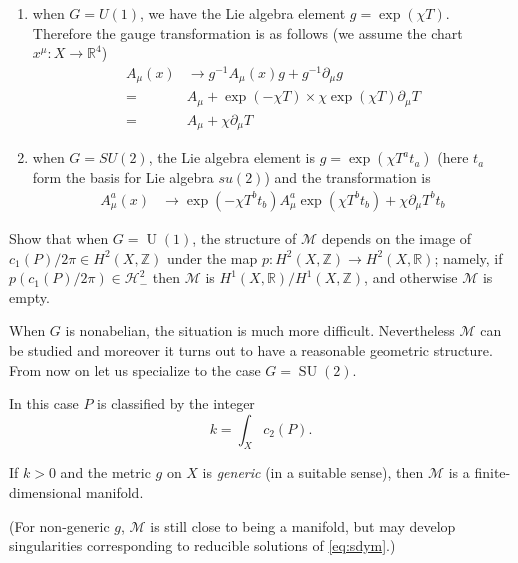\documentclass[12pt,letterpaper,reqno]{article}
\numberwithin{equation}{section}
\newcommand{\cM}{\ensuremath{\mathcal M}}
\newcommand{\cH}{\ensuremath{\mathcal H}}
\newcommand{\R}{\ensuremath{\mathbb R}}
\newcommand{\Z}{\ensuremath{\mathbb Z}}
\newcommand{\ti}[1]{\textit{#1}}
\DeclareMathOperator{\SU}{SU}
\DeclareMathOperator{\U}{U}
\newcommand{\fixme}[1]{{\color{orange}{[#1]}}}
\begin{document}
\begin{solution}
  \begin{enumerate}
  \item when $G=U(1)$, we have the Lie algebra element $g=\exp(\chi T)$.  Therefore the gauge transformation is as follows (we assume the chart $x^\mu:X\to \R^4$)
    \begin{equation}
      \begin{split}
        A_\mu(x) &\to g^{-1}A_\mu(x)g+g^{-1}\partial_{\mu}g\\
        =& A_\mu + \exp(-\chi T)\times\chi\exp(\chi T)\partial_\mu T\\
        =& A_\mu + \chi\partial_\mu T
      \end{split}
    \end{equation}
  \item when $G=SU(2)$, the Lie algebra element is $g=\exp(\chi T^at_a)$ (here $t_a$ form the basis for Lie algebra $su(2)$) and the transformation is 
    \begin{equation}
      \begin{split}
        A_\mu^a(x)&\to \exp(-\chi T^bt_b)A_\mu^a\exp(\chi T^bt_b)+\chi\partial_\mu T^bt_b
      \end{split}
    \end{equation}
  \end{enumerate}
\end{solution}

\begin{exercise}
Show that when $G = \U(1)$, the structure of $\cM$ depends on
the image of $c_1(P)/2\pi \in H^2(X,\Z)$ under the map
$p: H^2(X,\Z) \to H^2(X,\R)$; namely, if $p(c_1(P)/2\pi) \in \cH^2_-$
then $\cM$ is $H^1(X,\R) / H^1(X,\Z)$, and otherwise $\cM$ is empty.
\fixme{warning: needs Hodge theory}
\fixme{warning: I got this wrong twice already, hopefully it's right now}
\end{exercise}

When $G$ is nonabelian, the situation is much more difficult.
Nevertheless $\cM$ can be studied and moreover it turns out to have a 
reasonable geometric structure.
From now on let us specialize to the case $G = \SU(2)$.

In this case $P$ is classified by the integer
\begin{equation}
  k = \int_X c_2(P).
\end{equation}

\begin{fact}
If $k>0$ and the metric $g$ on $X$ is \ti{generic} (in a suitable sense), 
then $\cM$ is a finite-dimensional manifold.
\end{fact}
(For non-generic $g$, $\cM$ is still close to being a manifold, but 
may develop singularities corresponding
to reducible solutions of \eqref{eq:sdym}.)
\end{document}
